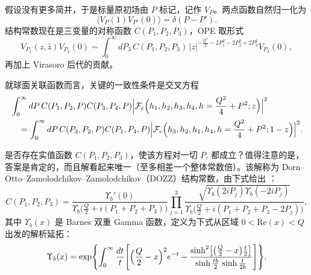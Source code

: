 
假设没有更多简并，于是标量原初场由 $P$ 标记，记作 $V_P$。两点函数自然归一化为
\begin{equation}\label{eq:3-60}
  \langle V_P(1)V_{P'}(0)\rangle=\delta(P-P').
\end{equation}
结构常数现在是三变量的对称函数 $C(P_1,P_2,P_3)$，OPE 取形式
\begin{equation}\label{eq:3-61}
  V_{P_1}(z,\bar z)V_{P_2}(0)\sim\int_0^{\infty}dP_3\,
  C(P_1,P_2,P_3)\,|z|^{-\frac{Q^2}{2}-2P_1^2-2P_2^2+2P_3^2}
  V_{P_3}(0),
\end{equation}
再加上 Virasoro 后代的贡献。


就球面关联函数而言，关键的一致性条件是交叉方程
\begin{equation}\label{eq:3-62}
  \begin{aligned}
  &\int_0^{\infty}dP\,C(P_1,P_2,P)C(P_3,P_4,P)
  \Bigl|\mathcal{F}_c\Bigl(h_1,h_2,h_3,h_4,h=\frac{Q^2}{4}+P^2;z\Bigr)\Bigr|^2\\
  &\quad=\int_0^{\infty}dP\,C(P_3,P_2,P)C(P_1,P_4,P)
  \Bigl|\mathcal{F}_c\Bigl(h_3,h_2,h_1,h_4,h=\frac{Q^2}{4}+P^2;1-z\Bigr)\Bigr|^2 .
  \end{aligned}
\end{equation}


是否存在实值函数 $C(P_1,P_2,P_3)$，使该方程对一切 $P_i$ 都成立？值得注意的是，答案是肯定的，而且解看起来唯一（至多相差一个整体常数倍）。该解称为 Dorn--Otto--Zamolodchikov--Zamolodchikov（DOZZ）结构常数，由下式给出 \cite{r12,r13,r14,r15}：
\begin{equation}\label{eq:3-63}
  C(P_1,P_2,P_3)
  =\frac{\Upsilon_b'(0)}{\Upsilon_b\bigl(\frac{Q}{2}+i(P_1+P_2+P_3)\bigr)}
  \prod_{j=1}^{3}
  \frac{\sqrt{\Upsilon_b(2iP_j)\Upsilon_b(-2iP_j)}}
  {\Upsilon_b\bigl(\frac{Q}{2}+i(P_1+P_2+P_3-2P_j)\bigr)},
\end{equation}
其中 $\Upsilon_b(x)$ 是 Barnes 双重 Gamma 函数，定义为下式从区域 $0<\mathrm{Re}(x)<Q$ 出发的解析延拓：
\begin{equation}\label{eq:3-64}
  \Upsilon_b(x)=\exp\Biggl\{
  \int_0^{\infty}\frac{dt}{t}
  \Biggl[\Bigl(\frac{Q}{2}-x\Bigr)^2e^{-t}
  -\frac{\sinh^2\bigl[\bigl(\frac{Q}{2}-x\bigr)\frac{t}{2}\bigr]}
  {\sinh\frac{tb}{2}\,\sinh\frac{t}{2b}}\Biggr]\Biggr\}.
\end{equation}


